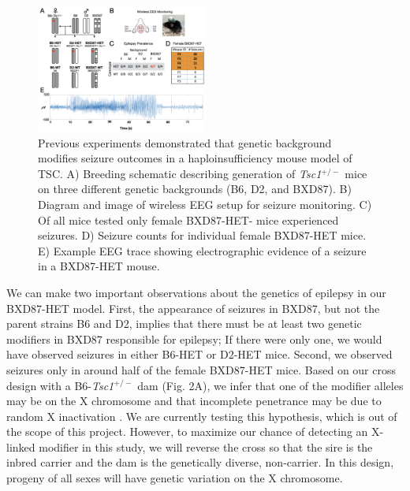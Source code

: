 \documentclass[
  12pt,
]{article}
\begin{document}
\begin{figure}[ht!]
\includegraphics[width=0.5\textwidth]{Fig2.png} 
\caption{Previous experiments demonstrated that genetic background modifies seizure outcomes in a haploinsufficiency mouse model of TSC. A) Breeding schematic describing generation of \textit{Tsc1}$^{+/-}$ mice on three different genetic backgrounds (B6, D2, and BXD87). B) Diagram and image of wireless EEG setup for seizure monitoring. C) Of all mice tested only female BXD87-HET- mice experienced seizures. D) Seizure counts for individual female BXD87-HET mice. E) Example EEG trace showing electrographic evidence of a seizure in a BXD87-HET mouse.
}
\label{fig:bxd}
\end{figure}

We can make two important observations about the genetics of epilepsy in
our BXD87-HET model. First, the appearance of seizures in BXD87, but not
the parent strains B6 and D2, implies that there must be at least two
genetic modifiers in BXD87 responsible for epilepsy; If there were only
one, we would have observed seizures in either B6-HET or D2-HET mice.
Second, we observed seizures only in around half of the female BXD87-HET
mice. Based on our cross design with a B6-\textit{Tsc1}\(^{+/-}\) dam
(Fig. 2A), we infer that one of the modifier alleles may be on the X
chromosome and that incomplete penetrance may be due to random X
inactivation \cite{15818384, 9618446}. We are currently testing this
hypothesis, which is out of the scope of this project. However, to
maximize our chance of detecting an X-linked modifier in this study, we
will reverse the cross so that the sire is the inbred carrier and the
dam is the genetically diverse, non-carrier. In this design, progeny of
all sexes will have genetic variation on the X chromosome.
\end{document}
